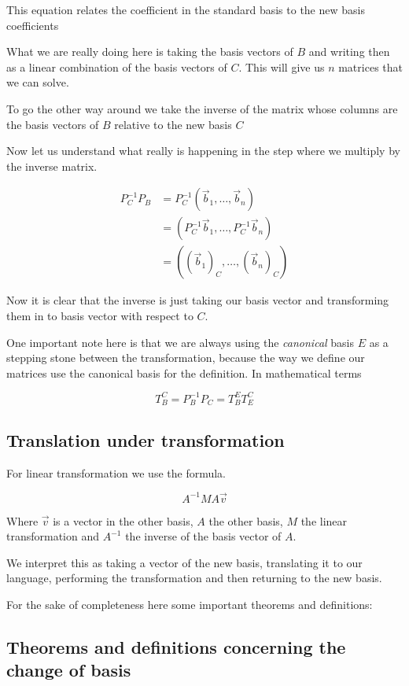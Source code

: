 This equation relates the coefficient in the standard basis to the new basis
coefficients

What we are really doing here is taking the basis vectors of \(B\) and writing then as a linear combination
of the basis vectors of \(C\). This will give us \(n\) matrices that we can solve.

To go the other way around we take the inverse of the matrix whose columns are the basis vectors of \(B\)
relative to the new basis \(C\)

Now let us understand what really is happening in the step where we multiply by the inverse matrix.

\begin{align*}
    P_{C}^{-1} P_B &= P_{C}^{-1}(\vec{b}_1, \dots, \vec{b}_n) \\
    &= (P_{C}^{-1}\vec{b}_1, \dots, P_{C}^{-1}\vec{b}_n)\\
    &= ({(\vec{b}_1)}_C, \dots, {(\vec{b}_n)}_C)
\end{align*}

Now it is clear that the inverse is just taking our basis vector and transforming
them in to basis vector with respect to \(C\).

One important note here is that we are always using the \emph{canonical} basis \(E\) as a stepping stone between 
the transformation, because the way we define our matrices use the canonical basis for the definition. In 
mathematical terms 

\[ 
    T_{B}^{C} = P_{B}^{-1}P_{C} = T_{B}^{E} T_{E}^{C}
\]

\subsection{Translation under transformation}

For linear transformation we use the formula.

\[
    A^{-1} M A \vec{v}
\]

Where \(\vec{v}\) is a vector in the other basis, \(A\) the
other basis, \(M\) the linear transformation and \(A^{-1}\) the inverse of
the basis vector of \(A\).

We interpret this as taking a vector of the new basis, translating it to our language,
performing the transformation and then returning to the new basis.

For the sake of completeness here some important theorems and definitions:

\subsection{Theorems and definitions concerning the change of basis}

